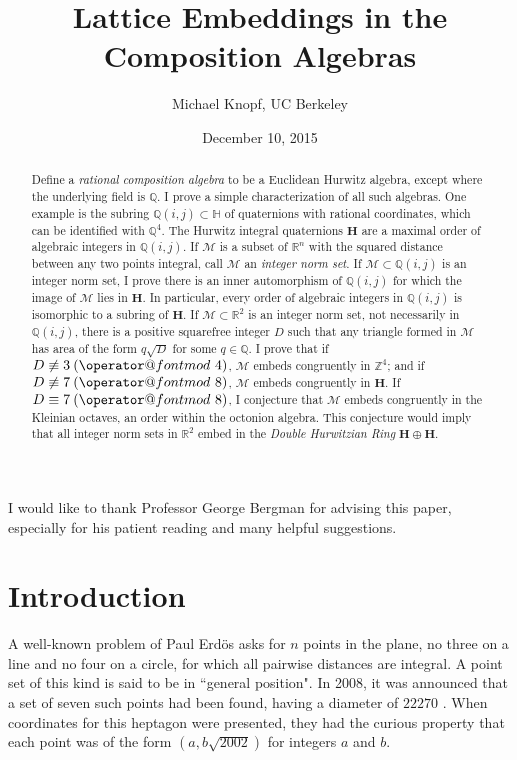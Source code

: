 \documentclass[10pt]{amsart}
\title{Lattice Embeddings in the Composition Algebras}
\author{Michael Knopf, UC Berkeley}
\date{December 10, 2015}
\makeatletter
\newcommand{\M}{\mathcal{M}}
\newcommand{\Q}{\mathbb{Q}}
\newcommand{\Z}{\mathbb{Z}}
\newcommand{\R}{\mathbb{R}}
\renewcommand{\H}{\mathbb{H}}
\newcommand{\HH}{\mathbf{H}}
\DeclareRobustCommand{\pmod}{\@pmods}
\def\@pmods#1{\mkern4mu({\operator@font mod}\mkern 6mu#1)}
\makeatother
\begin{document}
\maketitle
\noindent
I would like to thank Professor George Bergman for advising this paper, especially for his patient reading and many helpful suggestions.

\begin{abstract}
Define a \emph{rational composition algebra} to be a Euclidean Hurwitz algebra, except where the underlying field is $\Q$.  I prove a simple characterization of all such algebras.  One example is the subring $\Q(i,j) \subset \H$ of quaternions with rational coordinates, which can be identified with $\Q^4$.  The Hurwitz integral quaternions $\HH$ are a maximal order of algebraic integers in $\Q(i,j)$.  If $\M$ is a subset of $\R^n$ with the squared distance between any two points integral, call $\M$ an \emph{integer norm set}.  If $\M \subset \Q(i,j)$ is an integer norm set, I prove there is an inner automorphism of $\Q(i,j)$ for which the image of $\M$ lies in $\HH$.  In particular, every order of algebraic integers in $\Q(i,j)$ is isomorphic to a subring of $\HH$.  If $\M \subset \R^2$ is an integer norm set, not necessarily in $\Q(i,j)$, there is a positive squarefree integer $D$ such that any triangle formed in $\M$ has area of the form $q\sqrt{D}$ for some $q \in \Q$.  I prove that if $D \not \equiv 3 \pmod{4}$, $\M$ embeds congruently in $\Z^4$; and if $D \not \equiv 7 \pmod{8}$, $\M$ embeds congruently in $\HH$.  If $D \equiv 7 \pmod{8}$, I conjecture that $\M$ embeds congruently in the Kleinian octaves, an order within the octonion algebra.  This conjecture would imply that all integer norm sets in $\R^2$ embed in the \emph{Double Hurwitzian Ring} $\HH \oplus \HH$.
\end{abstract}

\section{Introduction}

A well-known problem of Paul Erd\"os asks for $n$ points in the plane, no three on a line and no four on a circle, for which all pairwise distances are integral.  A point set of this kind is said to be in ``general position".  In 2008, it was announced that a set of seven such points had been found, having a diameter of $22270$ \cite{Kr08}.  When coordinates for this heptagon were presented, they had the curious property that each point was of the form $(a,b\sqrt{2002})$ for integers $a$ and $b$.
\end{document}
